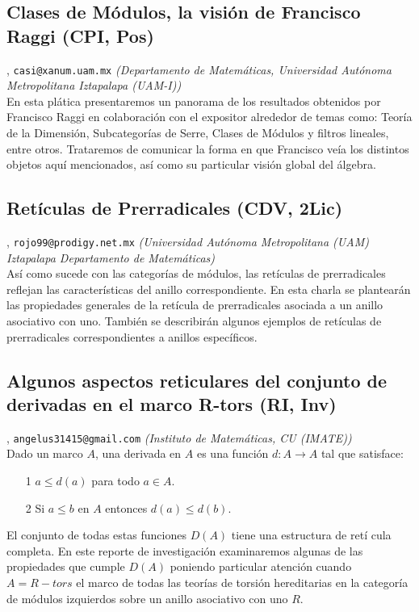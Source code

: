 \subsection{\sffamily Clases de M\'odulos, la visi\'on de Francisco Raggi {\footnotesize (CPI, Pos)}} \label{reg-1224} 
, {\tt casi@xanum.uam.mx}  {\slshape (Departamento de Matem\'aticas, Universidad Aut\'onoma Metropolitana Iztapalapa (UAM-I))}\\
          \noindent En esta pl\'atica presentaremos un panorama de los resultados obtenidos por Francisco Raggi en colaboraci\'on con el expositor alrededor de temas como: Teor\'ia de la Dimensi\'on, Subcategor\'ias de Serre, Clases de M\'odulos y filtros lineales, entre otros. Trataremos de comunicar la forma en que Francisco ve\'ia los distintos objetos aqu\'i mencionados, as\'i como su particular visi\'on global del \'algebra.
\subsection{\sffamily Ret\'iculas de Prerradicales {\footnotesize (CDV, 2Lic)}} \label{reg-490} 
, {\tt rojo99@prodigy.net.mx}  {\slshape (Universidad Aut\'onoma Metropolitana (UAM) Iztapalapa Departamento de Matem\'aticas)}\\
          \noindent As\'i como sucede con las categor\'ias de m\'odulos, las ret\'iculas de prerradicales reflejan las caracter\'isticas del anillo correspondiente. En esta charla se plantear\'an las propiedades generales de la ret\'icula de prerradicales asociada a un anillo asociativo con uno. Tambi\'en se describir\'an algunos ejemplos de ret\'iculas de prerradicales correspondientes a anillos espec\'ificos.
\subsection{\sffamily Algunos aspectos reticulares del conjunto de derivadas en el marco R-tors {\footnotesize (RI, Inv)}} \label{reg-1460} 
, {\tt angelus31415@gmail.com}  {\slshape (Instituto de Matem\'aticas, CU (IMATE))}\\
          \noindent Dado un marco $A$, una derivada en $A$ es una funci\'on $d:A\rightarrow A$ tal que satisface:\begin{itemize}\item[1]$a\leq d(a)$ para todo $a\in A$.\item[2]Si $a\leq b$ en $A$ entonces $d(a)\leq d(b)$.\end{itemize}El conjunto de todas estas funciones $D(A)$ tiene una estructura de ret\'i cula completa. En este reporte de investigaci\'on examinaremos algunas de las propiedades que cumple $D(A)$ poniendo particular atenci\'on cuando $A=R-tors$ el marco de todas las teor\'ias de torsi\'on hereditarias en la categor\'ia de m\'odulos izquierdos sobre un anillo asociativo con uno $R$.
